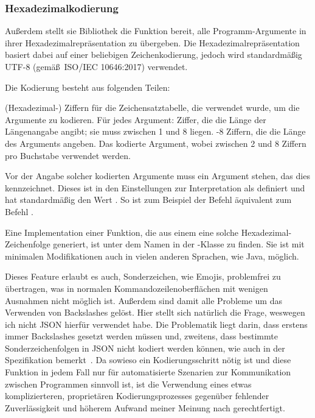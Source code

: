 \subsubsection{Hexadezimalkodierung}\label{Hexadecimalencoding}
Außerdem stellt sie Bibliothek die Funktion bereit, alle Programm-Argumente in ihrer Hexadezimalrepräsentation zu übergeben.
Die Hexadezimalrepräsentation basiert dabei auf einer beliebigen Zeichenkodierung, jedoch wird standardmäßig UTF-8 (gemäß~ISO/IEC 10646:2017) verwendet.

Die Kodierung besteht aus folgenden Teilen:
\begin{outline}
  (Hexadezimal-) Ziffern für die Zeichensatztabelle, die verwendet wurde, um die Argumente zu kodieren.
 \1 Für jedes Argument:
   Ziffer, die die Länge der Längenangabe angibt;
  sie muss zwischen 1 und 8 liegen. 
  -8 Ziffern, die die Länge des Arguments angeben.
  \2 Das kodierte Argument, wobei zwischen 2 und 8 Ziffern pro Buchstabe verwendet werden.
\end{outline}

Vor der Angabe solcher kodierten Argumente muss ein Argument stehen, das dies kennzeichnet.
Dieses ist in den Einstellungen zur Interpretation als  definiert und hat standardmäßig den Wert .
So ist zum Beispiel der Befehl  äquivalent zum Befehl .

Eine Implementation einer Funktion, die aus einem  eine solche Hexadezimal-Zeichenfolge generiert, ist unter dem Namen  in der -Klasse zu finden.
Sie ist mit minimalen Modifikationen auch in vielen anderen Sprachen, wie Java, möglich.

Dieses Feature erlaubt es auch, Sonderzeichen, wie Emojis, problemfrei zu übertragen, was in normalen Kommandozeilenoberflächen mit wenigen Ausnahmen nicht möglich ist.
Außerdem sind damit alle Probleme um das Verwenden von Backslashes gelöst.
Hier stellt sich natürlich die Frage, weswegen ich nicht JSON hierfür verwendet habe.
Die Problematik liegt darin, dass erstens immer Backslashes gesetzt werden müssen und, zweitens, dass bestimmte Sonderzeichenfolgen in JSON nicht kodiert werden können, wie auch in der Spezifikation bemerkt~\cite{JSONSpec}.
Da sowieso ein Kodierungsschritt nötig ist und diese Funktion in jedem Fall nur für automatisierte Szenarien zur Kommunikation zwischen Programmen sinnvoll ist,
ist die Verwendung eines etwas komplizierteren, proprietären Kodierungsprozesses gegenüber fehlender Zuverlässigkeit und höherem Aufwand meiner Meinung nach gerechtfertigt.
